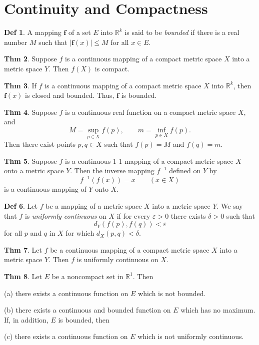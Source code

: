 \documentclass{article}
\theoremstyle{definition}
\newtheorem{definition}{Def}
\newtheorem{theorem}[definition]{Thm}
\begin{document}
\section{Continuity and Compactness}
\begin{definition}
    A mapping $\mathbf{f}$ of a set $E$ into $\mathbb{R}^k$ is said to be \textit{bounded} if there is a real number $M$ such that $|\mathbf{f}(x)|\leq M$ for all $x\in E$.
\end{definition}
\begin{theorem}
    Suppose $f$ is a continuous mapping of a compact metric space $X$ into a metric space $Y$. Then $f(X)$ is compact.
\end{theorem}
\begin{theorem}
    If $f$ is a continuous mapping of a compact metric space $X$ into $\mathbb{R}^k$, then $\mathbf{f}(x)$ is closed and bounded. Thus, $\mathbf{f}$ is bounded.
\end{theorem}
\begin{theorem}
    Suppose $f$ is a continuous real function on a compact metric space $X$, and
    \[
    M=\sup_{p\in X}f(p), \qquad m=\inf_{p\in X}f(p).
    \]
    Then there exist points $p,q\in X$ such that $f(p)=M$ and $f(q)=m$. 
\end{theorem}
\begin{theorem}
    Suppose $f$ is a continuous 1-1 mapping of a compact metric space $X$ onto a metric space $Y$. Then the inverse mapping $f^{-1}$ defined on $Y$ by
    \[
    f^{-1}(f(x))=x \qquad (x\in X)
    \]
    is a continuous mapping of $Y$ onto $X$.
\end{theorem}
\begin{definition}
    Let $f$ be a mapping of a metric space $X$ into a metric space $Y$. We say that $f$ is \textit{uniformly continuous} on $X$ if for every $\varepsilon>0$ there exists $\delta>0$ such that
    \[
    d_Y(f(p), f(q))<\varepsilon
    \]
    for all $p$ and $q$ in $X$ for which $d_X(p,q)<\delta$.
\end{definition}
\begin{theorem}
    Let $f$ be a continuous mapping of a compact metric space $X$ into a metric space $Y$. Then $f$ is uniformly continuous on $X$.
\end{theorem}
\begin{theorem}
    Let $E$ be a noncompact set in $\mathbb{R}^1$. Then\par
    (a) there exists a continuous function on $E$ which is not bounded.\par
    (b) there exists a continuous and bounded function on $E$ which has no maximum.\\
    If, in addition, $E$ is bounded, then\par
    (c) there exists a continuous function on $E$ which is not uniformly continuous.
\end{theorem}
\end{document}

